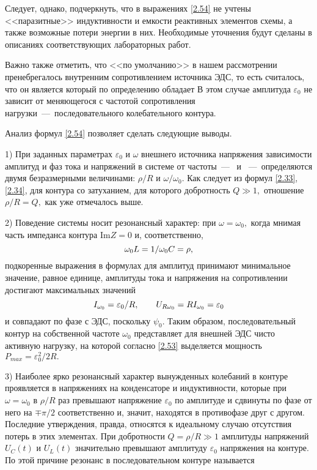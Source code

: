 Следует, однако, подчеркнуть, что в выражениях \eqref{2.54} не учтены <<паразитные>> индуктивности и емкости реактивных элементов схемы, а также возможные потери энергии в них. Необходимые уточнения будут сделаны в описаниях соответствующих лабораторных работ.

Важно также отметить, что <<по умолчанию>> в нашем рассмотрении пренебрегалось внутренним сопротивлением источника ЭДС, то есть считалось, что он является  который по определению обладает  В этом случае амплитуда $\varepsilon_0$ не зависит от меняющегося с частотой сопротивления нагрузки~---~последовательного колебательного контура.

Анализ формул \eqref{2.54} позволяет сделать следующие выводы.

1) При заданных параметрах $\varepsilon_0$ и $\omega$ внешнего источника напряжения зависимости амплитуд и фаз тока и напряжений в системе от частоты~---~ и ~---~определяются двумя безразмерными величинами: $\rho/R$ и $\omega/\omega_0.$ Как следует из формул \eqref{2.33}, \eqref{2.34}, для контура со  затуханием, для которого добротность $Q\gg1,$ отношение $\rho/R=Q,$ как уже отмечалось выше.

2) Поведение системы носит резонансный характер: при $\omega=\omega_0,$ когда мнимая часть импеданса контура $\text{Im}Z=0$ и, соответственно,
\begin{equation}\eqmark{2.55}
	\omega_0L=1/\omega_0C=\rho,
\end{equation}
подкоренные выражения в формулах для амплитуд принимают минимальное значение, равное единице, амплитуды тока и напряжения на сопротивлении достигают максимальных значений
\begin{equation}\eqmark{2.56}
	I_{\omega_0}=\varepsilon_0/R, \qquad U_{R\omega_0}=RI_{\omega_0}=\varepsilon_0
\end{equation}
и совпадают по фазе с ЭДС, поскольку $\psi_0.$ Таким образом, последовательный контур на собственной частоте $\omega_0$ представляет для внешней ЭДС чисто активную нагрузку, на которой согласно \eqref{2.53} выделяется мощность $P_{max}=\varepsilon_0^2/2R.$

3) Наиболее ярко резонансный характер вынужденных колебаний в  контуре проявляется в напряжениях на конденсаторе и индуктивности, которые при $\omega=\omega_0$ в $\rho/R$ раз превышают напряжение $\varepsilon_0$ по амплитуде и сдвинуты по фазе от него на $\mp\pi/2$ соответственно и, значит, находятся в противофазе друг с другом. Последние утверждения, правда, относятся к идеальному случаю отсутствия потерь в этих элементах. При добротности $Q=\rho/R\gg1$ амплитуды напряжений $U_C(t)$ и $U_L(t)$ значительно превышают амплитуду $\varepsilon_0$ напряжения на контуре. По этой причине резонанс в последовательном контуре называется 

